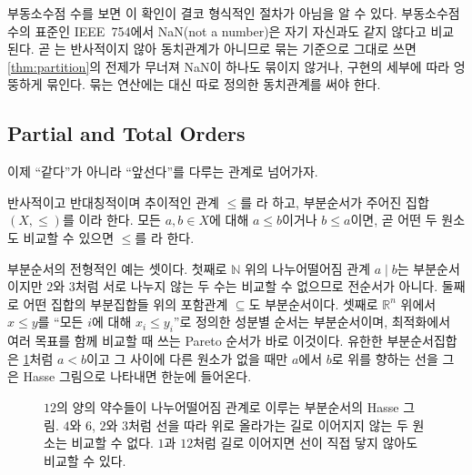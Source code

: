 부동소수점 수를 보면 이 확인이 결코 형식적인 절차가 아님을 알 수 있다. 부동소수점 수의 표준인 IEEE~754에서 NaN(not a number)은 자기 자신과도 같지 않다고 비교된다\cite{ieee754-2019}. 곧 \code{==}는 반사적이지 않아 동치관계가 아니므로 묶는 기준으로 그대로 쓰면 \cref{thm:partition}의 전제가 무너져 NaN이 하나도 묶이지 않거나, 구현의 세부에 따라 엉뚱하게 묶인다. 묶는 연산에는 \code{==} 대신 따로 정의한 동치관계를 써야 한다.

\subsection{Partial and Total Orders}

이제 ``같다''가 아니라 ``앞선다''를 다루는 관계로 넘어가자.

\begin{definition}
\label{def:partial-order}
반사적이고 반대칭적이며 추이적인 관계 $\le$를 라 하고, 부분순서가 주어진 집합 $(X,\le)$를 이라 한다. 모든 $a,b\in X$에 대해 $a\le b$이거나 $b\le a$이면, 곧 어떤 두 원소도 비교할 수 있으면 $\le$를 라 한다.
\end{definition}

부분순서의 전형적인 예는 셋이다. 첫째로 $\mathbb{N}$ 위의 나누어떨어짐 관계 $a\mid b$는 부분순서이지만 $2$와 $3$처럼 서로 나누지 않는 두 수는 비교할 수 없으므로 전순서가 아니다. 둘째로 어떤 집합의 부분집합들 위의 포함관계 $\subseteq$도 부분순서이다. 셋째로 $\mathbb{R}^n$ 위에서 $x\le y$를 ``모든 $i$에 대해 $x_i\le y_i$''로 정의한 성분별 순서는 부분순서이며, 최적화에서 여러 목표를 함께 비교할 때 쓰는 Pareto 순서가 바로 이것이다. 유한한 부분순서집합은 \cref{fig:hasse}처럼 $a<b$이고 그 사이에 다른 원소가 없을 때만 $a$에서 $b$로 위를 향하는 선을 그은 Hasse 그림으로 나타내면 한눈에 들어온다.

\begin{figure}[htbp]
\centering
{}
\caption{$12$의 양의 약수들이 나누어떨어짐 관계로 이루는 부분순서의 Hasse 그림. $4$와 $6$, $2$와 $3$처럼 선을 따라 위로 올라가는 길로 이어지지 않는 두 원소는 비교할 수 없다. $1$과 $12$처럼 길로 이어지면 선이 직접 닿지 않아도 비교할 수 있다.}
\label{fig:hasse}
\end{figure}

